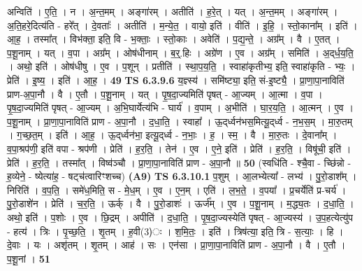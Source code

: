 \documentclass[17pt]{extarticle}
\begin{document}
                  अन्विति॑ । ए॒ति॒ । न । अ॒न्त॒मम् । अङ्गा॑रम् । अतीति॑ । ह॒रे॒त् । यत् । अ॒न्त॒मम् । अङ्गा॑रम् । अ॒ति॒हरे॒दित्य॑ति - हरे᳚त् । दे॒वताः᳚ । अतीति॑ । म॒न्ये॒त॒ । वायो॒ इति॑ । वीति॑ । इ॒हि॒ । स्तो॒काना᳚म् । इति॑ । आ॒ह॒ । तस्मा᳚त् । विभ॑क्ता॒ इति॒ वि - भ॒क्ताः॒ । स्तो॒काः । अवेति॑ । प॒द्य॒न्ते॒ । अग्र᳚म् । वै । ए॒तत् । प॒शू॒नाम् । यत् । व॒पा । अग्र᳚म् । ओष॑धीनाम् । ब॒र्॒.हिः । अग्रे॑ण । ए॒व । अग्र᳚म् । समिति॑ । अ॒द्‌र्ध॒य॒ति॒ । अथो॒ इति॑ । ओष॑धीषु । ए॒व । प॒शून् । प्रतीति॑ । स्था॒प॒य॒ति॒ । स्वाहा॑कृतीभ्य॒ इति॒ स्वाहा॑कृति - भ्यः॒ । प्रेति॑ । इ॒ष्य॒ । इति॑ । आ॒ह॒ । \textbf{  49} \newline
                  \newline
                                \textbf{ TS 6.3.9.6} \newline
                  य॒ज्ञ्स्य॑ । समि॑ष्ट्या॒ इति॒ सं-इ॒ष्ट्यै॒ । प्रा॒णा॒पा॒नाविति॑ प्राण-अ॒पा॒नौ । वै । ए॒तौ । प॒शू॒नाम् । यत् । पृ॒ष॒दा॒ज्यमिति॑ पृषत् - आ॒ज्यम् । आ॒त्मा । व॒पा । पृ॒ष॒दा॒ज्यमिति॑ पृषत् - आ॒ज्यम् । अ॒भि॒घार्येत्य॑भि - घार्य॑ । व॒पाम् । अ॒भीति॑ । घा॒र॒य॒ति॒ । आ॒त्मन् । ए॒व । प॒शू॒नाम् । प्रा॒णा॒पा॒नाविति॑ प्राण - अ॒पा॒नौ । द॒धा॒ति॒ । स्वाहा᳚ । ऊ॒द्‌र्ध्वन॑भस॒मित्यू॒द्‌र्ध्व - न॒भ॒स॒म् । मा॒रु॒तम् । ग॒च्छ॒त॒म् । इति॑ । आ॒ह॒ । ऊ॒द्‌र्ध्वन॑भा॒ इत्यू॒द्‌र्ध्व - न॒भाः॒ । ह॒ । स्म॒ । वै । मा॒रु॒तः । दे॒वाना᳚म् । व॒पा॒श्रप॑णी॒ इति॑ वपा - श्रप॑णी । प्रेति॑ । ह॒र॒ति॒ । तेन॑ । ए॒व । ए॒ने॒ इति॑ । प्रेति॑ । ह॒र॒ति॒ । विषू॑ची॒ इति॑ । प्रेति॑ । ह॒र॒ति॒ । तस्मा᳚त् । विष्व॑ञ्चौ । प्रा॒णा॒पा॒नाविति॑ प्राण - अ॒पा॒नौ ॥ \textbf{  50} \newline
                  \newline
                      (स्वधि॑ति - श्चै॒वा - च्छि॑न्नो - ह॒व्येने॒ - ष्येत्या॑ह॒ - षट्च॑त्वारिꣳशच्च)  \textbf{(A9)} \newline \newline
                                \textbf{ TS 6.3.10.1} \newline
                  प॒शुम् । आ॒लभ्येत्या᳚ - लभ्य॑ । पु॒रो॒डाश᳚म् । निरिति॑ । व॒प॒ति॒ । समे॑ध॒मिति॒ स - मे॒ध॒म् । ए॒व । ए॒न॒म् । एति॑ । ल॒भ॒ते॒ । व॒पया᳚ । प्र॒चर्येति॑ प्र-चर्य॑ । पु॒रो॒डाशे॑न । प्रेति॑ । च॒र॒ति॒ । ऊर्क् । वै । पु॒रो॒डाशः॑ । ऊर्ज᳚म् । ए॒व । प॒शू॒नाम् । म॒द्ध्य॒तः । द॒धा॒ति॒ । अथो॒ इति॑ । प॒शोः । ए॒व । छि॒द्रम् । अपीति॑ । द॒धा॒ति॒ । पृ॒ष॒दा॒ज्यस्येति॑ पृषत् - आ॒ज्यस्य॑ । उ॒प॒हत्येत्यु॑प - हत्य॑ । त्रिः । पृ॒च्छ॒ति॒ । शृ॒तम् । ह॒वी(3)ः । श॒मि॒तः॒ । इति॑ । त्रिष॑त्या॒ इति॒ त्रि - स॒त्याः॒ । हि । दे॒वाः । यः । अशृ॑तम् । शृ॒तम् । आह॑ । सः । एन॑सा । प्रा॒णा॒पा॒नाविति॑ प्राण - अ॒पा॒नौ । वै । ए॒तौ । प॒शू॒नां । \textbf{  51} \newline
\end{document}
